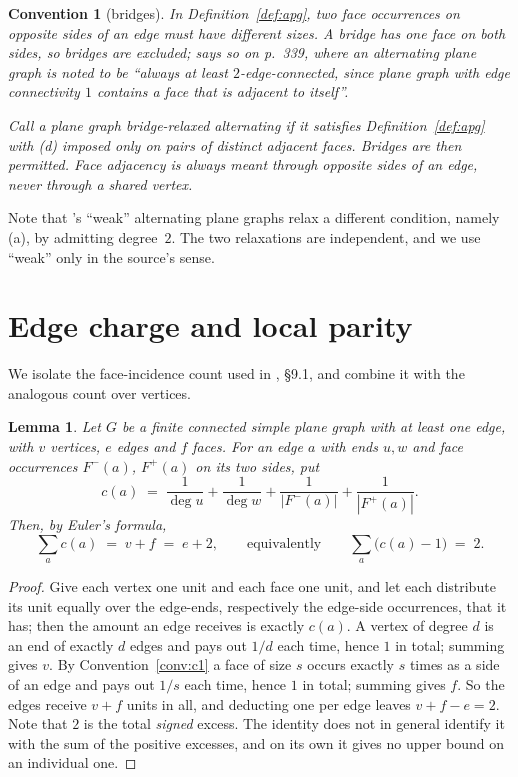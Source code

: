 \documentclass{baustms}
\theoremstyle{cupthm}
\newtheorem{lemma}[theorem]{Lemma}
\theoremstyle{cupdefn}
\newtheorem{convention}[theorem]{Convention}
\theoremstyle{cuprem}
\begin{document}
\begin{convention}[bridges]\label{conv:c2}
In Definition~\ref{def:apg}, two face occurrences on opposite sides of an edge
must have different sizes. A bridge has one face on both sides, so bridges are
excluded; \cite{AHSSV2015} says so on p.~339, where an alternating plane graph is
noted to be ``always at least $2$-edge-connected, since plane graph with edge
connectivity $1$ contains a face that is adjacent to itself''.

Call a plane graph \emph{bridge-relaxed alternating} if it satisfies
Definition~\ref{def:apg} with (d) imposed only on pairs of \emph{distinct}
adjacent faces. Bridges are then permitted. Face adjacency is always meant
through opposite sides of an edge, never through a shared vertex.
\end{convention}

Note that \cite{AHSSV2015}'s ``weak'' alternating plane graphs relax a different
condition, namely (a), by admitting degree~$2$. The two relaxations are
independent, and we use ``weak'' only in the source's sense.

\section{Edge charge and local parity}\label{sec:identity}

We isolate the face-incidence count used in \cite{AHSSV2015}, \S9.1, and combine
it with the analogous count over vertices.

\begin{lemma}\label{lem:identity}
Let $G$ be a finite connected simple plane graph with at least one edge, with $v$
vertices, $e$ edges and $f$ faces. For an edge $a$ with ends $u,w$ and face
occurrences $F^-(a)$, $F^+(a)$ on its two sides, put
\[
  c(a) \;=\; \frac{1}{\deg u} + \frac{1}{\deg w}
           + \frac{1}{|F^-(a)|} + \frac{1}{|F^+(a)|}.
\]
Then, by Euler's formula,
\begin{equation}\label{eq:identity}
  \sum_{a} c(a) \;=\; v + f \;=\; e + 2,
  \qquad\text{equivalently}\qquad
  \sum_{a} \bigl(c(a) - 1\bigr) \;=\; 2 .
\end{equation}
\end{lemma}

\begin{proof}
Give each vertex one unit and each face one unit, and let each distribute its
unit equally over the edge-ends, respectively the edge-side occurrences, that it
has; then the amount an edge receives is exactly $c(a)$. A vertex of degree $d$
is an end of exactly $d$ edges and pays out $1/d$ each time, hence $1$ in total;
summing gives $v$. By Convention~\ref{conv:c1} a face of size $s$ occurs exactly
$s$ times as a side of an edge and pays out $1/s$ each time, hence $1$ in total;
summing gives $f$. So the edges receive $v+f$ units in all, and deducting one per
edge leaves $v+f-e = 2$. Note that $2$ is the total \emph{signed} excess. The
identity does not in general identify it with the sum of the positive excesses,
and on its own it gives no upper bound on an individual one.
\end{proof}
\end{document}
